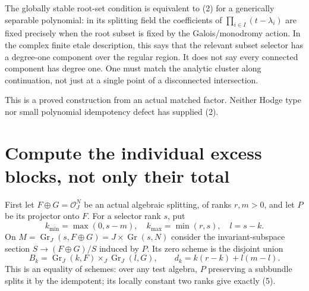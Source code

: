 \documentclass[11pt]{article}
\newcommand{\Gr}{\operatorname{Gr}}
\begin{document}
The globally stable root-set condition is equivalent to (2) for a
generically separable polynomial: in its splitting field the coefficients
of $\prod_{i\in I}(t-\lambda_i)$ are fixed precisely when the root subset
is fixed by the Galois/monodromy action. In the complex finite etale
description, this says that the relevant subset selector has a degree-one
component over the regular region. It does not say every connected
component has degree one. One must match the analytic cluster along
continuation, not just at a single point of a disconnected intersection.

This is a proved construction from an actual matched factor. Neither
Hodge type nor small polynomial idempotency defect has supplied (2).

\section{Compute the individual excess blocks, not only their total}
First let $F\oplus G=\mathcal O_J^N$ be an actual algebraic splitting,
of ranks $r,m>0$, and let $P$ be its projector onto $F$.
For a selector rank $s$, put
\[
 k_{\min}=\max(0,s-m),\quad k_{\max}=\min(r,s),\quad l=s-k.
\]
On $M=\Gr_J(s,F\oplus G)=J\times\Gr(s,N)$ consider the invariant-subspace
section $S\to (F\oplus G)/S$ induced by $P$. Its zero scheme is the disjoint
union
\[
 B_k=\Gr_J(k,F)\times_J\Gr_J(l,G),\qquad
 d_k=k(r-k)+l(m-l).                                    \tag{5}
\]
This is an equality of schemes: over any test algebra, $P$ preserving a
subbundle splits it by the idempotent; its locally constant two ranks
give exactly (5).
\end{document}
